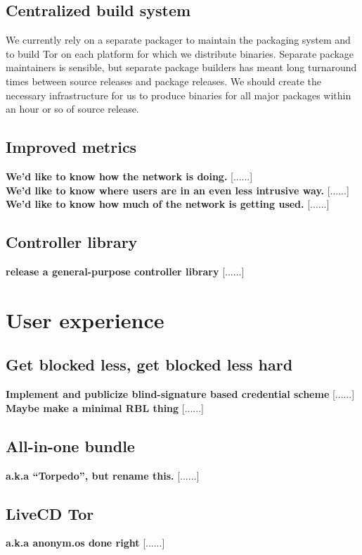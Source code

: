 \documentclass{article}
\newcommand{\tmp}[1]{{\bf #1} [......] \\}
\begin{document}
\subsection{Centralized build system}
We currently rely on a separate packager to maintain the packaging system and
to build Tor on each platform for which we distribute binaries.  Separate
package maintainers is sensible, but separate package builders has meant
long turnaround times between source releases and package releases.  We
should create the necessary infrastructure for us to produce binaries for all
major packages within an hour or so of source release.

\subsection{Improved metrics}
\tmp{We'd like to know how the network is doing.}

\tmp{We'd like to know where users are in an even less intrusive way.}

\tmp{We'd like to know how much of the network is getting used.}

\subsection{Controller library}
\tmp{release a general-purpose controller library}

\section{User experience}

\subsection{Get blocked less, get blocked less hard}
\tmp{Implement  and publicize blind-signature based credential scheme}

\tmp{Maybe make a minimal RBL thing}

\subsection{All-in-one bundle}
\tmp{a.k.a ``Torpedo'', but rename this.}

\subsection{LiveCD Tor}
\tmp{a.k.a anonym.os done right}
\end{document}
